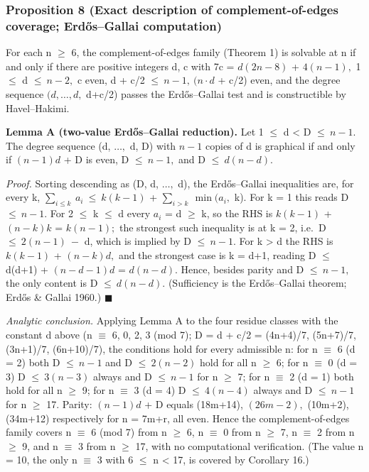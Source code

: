 \documentclass[
]{article}
\begin{document}
\subsubsection{Proposition 8 (Exact description of complement-of-edges
coverage; Erdős--Gallai
computation)}\label{proposition-8-exact-description-of-complement-of-edges-coverage-erdux151sgallai-computation}

For each n \(\ge\) 6, the complement-of-edges family (Theorem 1) is
solvable at n if and only if there are positive integers d, c with 7c =
\(d(2n-8)\) + \(4(n-1),\) 1 \(\le\) d \(\le\ n-2,\) c even, d + c/2
\(\le\ n-1,\ (n\cdot d\) + c/2) even, and the degree sequence
\((d,\dots,d,\) d+c/2) passes the Erdős--Gallai test and is
constructible by Havel--Hakimi.

\textbf{Lemma A (two-value Erdős--Gallai reduction).} Let 1 \(\le\) d
\textless{} D \(\le\ n-1.\) The degree sequence (d, \(\dots,\) d, D)
with \(n-1\) copies of d is graphical if and only if \((n-1)d\) + D is
even, D \(\le\ n-1,\) and D \(\le\ d(n-d).\)

\emph{Proof.} Sorting descending as (D, d, \(\dots,\) d), the
Erdős--Gallai inequalities are, for every k,
\(\sum_{i\le k}\ a_i\ \le\ k(k-1)\) + \(\sum_{i>k}\ \min(a_i,\) k). For
k = 1 this reads D \(\le\ n-1.\) For 2 \(\le\) k \(\le\) d every \(a_i\)
= d \(\ge\) k, so the RHS is \(k(k-1)\) + \((n-k)k\) = \(k(n-1);\) the
strongest such inequality is at k = 2, i.e.~D \(\le\ 2(n-1)\ -\) d,
which is implied by D \(\le\ n-1.\) For k \textgreater{} d the RHS is
\(k(k-1)\) + \((n-k)d,\) and the strongest case is k = d+1, reading D
\(\le\) d(d+1) + \((n-d-1)d\) = \(d(n-d).\) Hence, besides parity and D
\(\le\ n-1,\) the only content is D \(\le\ d(n-d).\) (Sufficiency is the
Erdős--Gallai theorem; Erdős \& Gallai 1960.) \(\blacksquare\)

\emph{Analytic conclusion.} Applying Lemma A to the four residue classes
with the constant d above (n \(\equiv\) 6, 0, 2, 3 (mod 7); D = d + c/2
= (4n+4)/7, (5n+7)/7, (3n+1)/7, (6n+10)/7), the conditions hold for
every admissible n: for n \(\equiv\) 6 (d = 2) both D \(\le\ n-1\) and D
\(\le\ 2(n-2)\) hold for all n \(\ge\) 6; for n \(\equiv\) 0 (d = 3) D
\(\le\ 3(n-3)\) always and D \(\le\ n-1\) for n \(\ge\) 7; for n
\(\equiv\) 2 (d = 1) both hold for all n \(\ge\) 9; for n \(\equiv\) 3
(d = 4) D \(\le\ 4(n-4)\) always and D \(\le\ n-1\) for n \(\ge\) 17.
Parity: \((n-1)d\) + D equals (18m+14), \((26m-2),\) (10m+2), (34m+12)
respectively for n = 7m+r, all even. Hence the complement-of-edges
family covers n \(\equiv\) 6 (mod 7) from n \(\ge\) 6, n \(\equiv\) 0
from n \(\ge\) 7, n \(\equiv\) 2 from n \(\ge\) 9, and n \(\equiv\) 3
from n \(\ge\) 17, with no computational verification. (The value n =
10, the only n \(\equiv\) 3 with 6 \(\le\) n \textless{} 17, is covered
by Corollary 16.)
\end{document}
